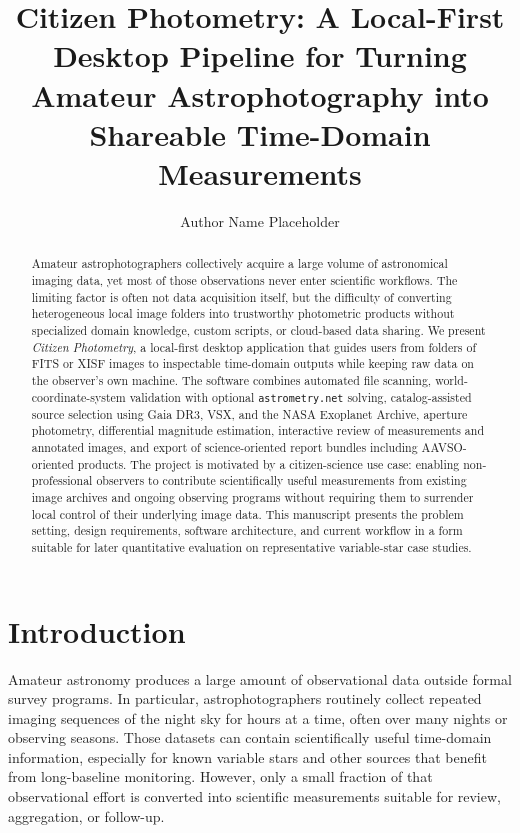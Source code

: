 \documentclass[modern]{aastex701}
\begin{document}
\title{Citizen Photometry: A Local-First Desktop Pipeline for Turning Amateur Astrophotography into Shareable Time-Domain Measurements}


\author{Author Name Placeholder}

\begin{abstract}
Amateur astrophotographers collectively acquire a large volume of astronomical imaging data, yet most of those observations never enter scientific workflows. The limiting factor is often not data acquisition itself, but the difficulty of converting heterogeneous local image folders into trustworthy photometric products without specialized domain knowledge, custom scripts, or cloud-based data sharing. We present \emph{Citizen Photometry}, a local-first desktop application that guides users from folders of FITS or XISF images to inspectable time-domain outputs while keeping raw data on the observer's own machine. The software combines automated file scanning, world-coordinate-system validation with optional \texttt{astrometry.net} solving, catalog-assisted source selection using Gaia DR3, VSX, and the NASA Exoplanet Archive, aperture photometry, differential magnitude estimation, interactive review of measurements and annotated images, and export of science-oriented report bundles including AAVSO-oriented products. The project is motivated by a citizen-science use case: enabling non-professional observers to contribute scientifically useful measurements from existing image archives and ongoing observing programs without requiring them to surrender local control of their underlying image data. This manuscript presents the problem setting, design requirements, software architecture, and current workflow in a form suitable for later quantitative evaluation on representative variable-star case studies.
\end{abstract}


\section{Introduction}\label{sec:introduction}

Amateur astronomy produces a large amount of observational data outside formal survey programs. In particular, astrophotographers routinely collect repeated imaging sequences of the night sky for hours at a time, often over many nights or observing seasons. Those datasets can contain scientifically useful time-domain information, especially for known variable stars and other sources that benefit from long-baseline monitoring. However, only a small fraction of that observational effort is converted into scientific measurements suitable for review, aggregation, or follow-up.
\end{document}
